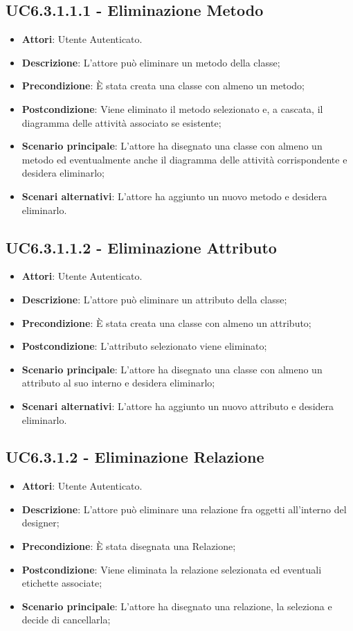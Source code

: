 \subsection{UC6.3.1.1.1 - Eliminazione Metodo} 
\label{ssec:UC6.3.1.1.1} 
\begin{itemize} 
\item \textbf{Attori}: Utente Autenticato.
\item \textbf{Descrizione}: L'attore può eliminare un metodo della classe;
\item \textbf{Precondizione}: È stata creata una classe con almeno un metodo;
\item \textbf{Postcondizione}: Viene eliminato il metodo selezionato e, a cascata, il diagramma delle attività associato se esistente;
\item \textbf{Scenario principale}: L'attore ha disegnato una classe con almeno un metodo ed  eventualmente anche il diagramma delle attività corrispondente e desidera eliminarlo;\item \textbf{Scenari alternativi}: L'attore ha aggiunto un nuovo metodo e desidera eliminarlo.
\end{itemize} 
\subsection{UC6.3.1.1.2 - Eliminazione Attributo} 
\label{ssec:UC6.3.1.1.2} 
\begin{itemize} 
\item \textbf{Attori}: Utente Autenticato.
\item \textbf{Descrizione}: L'attore può eliminare un attributo della classe;
\item \textbf{Precondizione}: È stata creata una classe con almeno un attributo;
\item \textbf{Postcondizione}: L'attributo selezionato viene eliminato;
\item \textbf{Scenario principale}: L'attore ha disegnato una classe con almeno un attributo al suo interno e desidera eliminarlo;\item \textbf{Scenari alternativi}: L'attore ha aggiunto un nuovo attributo e desidera eliminarlo.
\end{itemize} 
\subsection{UC6.3.1.2 - Eliminazione Relazione} 
\label{ssec:UC6.3.1.2} 
\begin{itemize} 
\item \textbf{Attori}: Utente Autenticato.
\item \textbf{Descrizione}: L'attore può eliminare una relazione fra oggetti all'interno del designer;
\item \textbf{Precondizione}: È stata disegnata una Relazione;
\item \textbf{Postcondizione}: Viene eliminata la relazione selezionata ed eventuali etichette associate;
\item \textbf{Scenario principale}: L'attore ha disegnato una relazione, la seleziona e decide di cancellarla;\end{itemize} 
